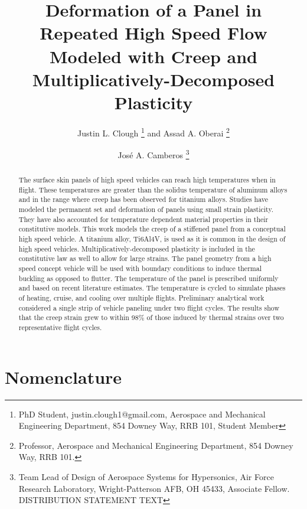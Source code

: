 \documentclass[conf]{new-aiaa}
\title{ Deformation of a Panel in Repeated High Speed Flow 
        Modeled with Creep and Multiplicatively-Decomposed Plasticity}
\author{Justin L. Clough%
        \footnote{
          PhD Student, 
          justin.clough1@gmail.com,
          Aerospace and Mechanical Engineering Department, 
          854 Downey Way, RRB 101,
          Student Member}
        and Assad A. Oberai%
        \footnote{  
          Professor, 
          Aerospace and Mechanical Engineering Department, 
          854 Downey Way, RRB 101.}}
\affil{University of Southern California,
       Los Angeles, CA, 90089}
\author{Jos\'e A. Camberos%
        \footnote{
          Team Lead of Design of Aerospace Systems for Hypersonics, 
          Air Force Research Laboratory,
          Wright-Patterson AFB, OH 45433,
          Associate Fellow.
          \newline
          \newline
          DISTRIBUTION STATEMENT TEXT}}
\affil{Air Force Research Laboratory, Wright-Patterson AFB,
       Dayton, OH, 45433}
\begin{document}
\maketitle

\begin{abstract}
The surface skin panels of high speed vehicles can reach high 
temperatures when in flight. 
These temperatures are greater than the solidus temperature
of aluminum alloys and in the range where
creep has been observed for titanium alloys.
Studies have modeled the permanent set and deformation 
of panels using small strain plasticity.
They have also accounted for temperature
dependent material properties in their constitutive models.
This work models the creep of a stiffened panel
from a conceptual high speed vehicle.
A titanium alloy, Ti6Al4V,
is used as it is common in the design of high speed vehicles.
Multiplicatively-decomposed plasticity 
is included in the constitutive law as well to allow for large strains.
The panel geometry from a high speed concept vehicle will be
used with boundary conditions to induce thermal buckling
as opposed to flutter.
The temperature of the panel is prescribed uniformly 
and based on recent literature estimates.
The temperature is cycled to simulate phases of
heating, cruise, and cooling over multiple flights.
Preliminary analytical work considered a single strip
of vehicle paneling under two flight cycles.
The results show that the creep strain
grew to within 98\% of those induced by thermal strains 
over two representative flight cycles.
\end{abstract}

\section{Nomenclature}
\end{document}
